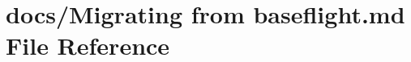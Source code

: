 \hypertarget{Migrating_01from_01baseflight_8md}{\section{docs/\+Migrating from baseflight.\+md File Reference}
\label{Migrating_01from_01baseflight_8md}
}
